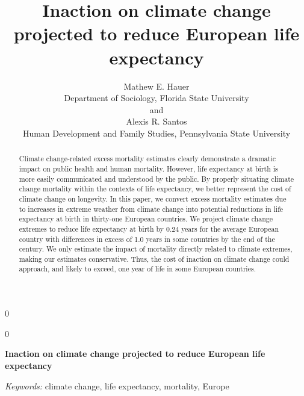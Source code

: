 \documentclass[12pt]{article}
\newcommand{\blind}{0}
\begin{document}
\def\spacingset#1{\renewcommand{\baselinestretch}%
{#1}\small\normalsize} \spacingset{1}



\blind
{
  \title{\bf Inaction on climate change projected to reduce European life expectancy}

  \author{
        Mathew E. Hauer \\
    Department of Sociology, Florida State University\\
     and \\     Alexis R. Santos \\
    Human Development and Family Studies, Pennsylvania State University\\
      }
  \maketitle
} \fi

\blind
{
  \bigskip
  \bigskip
  \bigskip
  \begin{center}
    {\LARGE\bf Inaction on climate change projected to reduce European life expectancy}
  \end{center}
  \medskip
} \fi

\bigskip
\begin{abstract}
Climate change-related excess mortality estimates clearly demonstrate a
dramatic impact on public health and human mortality. However, life
expectancy at birth is more easily communicated and understood by the
public. By properly situating climate change mortality within the
contexts of life expectancy, we better represent the cost of climate
change on longevity. In this paper, we convert excess mortality
estimates due to increases in extreme weather from climate change into
potential reductions in life expectancy at birth in thirty-one European
countries. We project climate change extremes to reduce life expectancy
at birth by 0.24 years for the average European country with differences
in excess of 1.0 years in some countries by the end of the century. We
only estimate the impact of mortality directly related to climate
extremes, making our estimates conservative. Thus, the cost of inaction
on climate change could approach, and likely to exceed, one year of life
in some European countries.
\end{abstract}

\noindent%
{\it Keywords:} climate change, life expectancy, mortality, Europe
\vfill
\end{document}
